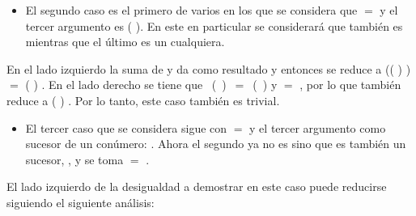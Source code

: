 \begin{AgdaAlign}
\begin{itemize}
\item El segundo caso es el primero de varios en los que se considera que  $=$  y el tercer argumento es ( ). En este en particular se considerará que  también es  mientras que el último es un  cualquiera. 
\end{itemize}

En el lado izquierdo la suma de  y  da como resultado  y entonces se reduce a   (( ) \AgdaFunction{+} ) $=$ ( ) \AgdaFunction{+} . En el lado derecho se tiene que \hbox{  ( ) $=$ ( )} y    $=$ , por lo que también reduce a ( ) \AgdaFunction{+} . Por lo tanto, este caso también es trivial.

\begin{itemize}
\item El tercer caso que se considera sigue con  $=$  y el tercer argumento como sucesor de un conúmero:  . Ahora el segundo ya no es  sino que es también un sucesor,  , y se toma  $=$  . 
\end{itemize}

El lado izquierdo de la desigualdad a demostrar en este caso puede reducirse siguiendo el siguiente análisis: 


\end{AgdaAlign}
